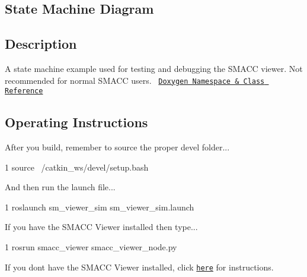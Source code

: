 \subsection*{State Machine Diagram}



\subsection*{Description}

A state machine example used for testing and debugging the S\+M\+A\+CC viewer. Not recommended for normal S\+M\+A\+CC users.~\newline
 \href{https://reelrbtx.github.io/SMACC_Documentation/master/html/namespacesm__viewer__sim.html}{\tt Doxygen Namespace \& Class Reference}

\subsection*{Operating Instructions}

After you build, remember to source the proper devel folder...


\begin{DoxyCode}
1 source ~/catkin\_ws/devel/setup.bash
\end{DoxyCode}


And then run the launch file...


\begin{DoxyCode}
1 roslaunch sm\_viewer\_sim sm\_viewer\_sim.launch
\end{DoxyCode}
 If you have the S\+M\+A\+CC Viewer installed then type...


\begin{DoxyCode}
1 rosrun smacc\_viewer smacc\_viewer\_node.py
\end{DoxyCode}


If you don\textquotesingle{}t have the S\+M\+A\+CC Viewer installed, click \href{http://smacc.ninja/smacc-viewer/}{\tt here} for instructions. 